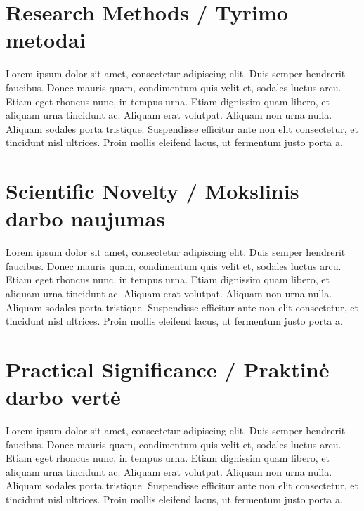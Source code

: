 \section*{Research Methods / Tyrimo metodai}

Lorem ipsum dolor sit amet, consectetur adipiscing elit. Duis semper hendrerit faucibus. Donec mauris quam, condimentum quis velit et, sodales luctus arcu. Etiam eget rhoncus nunc, in tempus urna. Etiam dignissim quam libero, et aliquam urna tincidunt ac. Aliquam erat volutpat. Aliquam non urna nulla. Aliquam sodales porta tristique. Suspendisse efficitur ante non elit consectetur, et tincidunt nisl ultrices. Proin mollis eleifend lacus, ut fermentum justo porta a.



\section*{Scientific Novelty / Mokslinis darbo naujumas} %

Lorem ipsum dolor sit amet, consectetur adipiscing elit. Duis semper hendrerit faucibus. Donec mauris quam, condimentum quis velit et, sodales luctus arcu. Etiam eget rhoncus nunc, in tempus urna. Etiam dignissim quam libero, et aliquam urna tincidunt ac. Aliquam erat volutpat. Aliquam non urna nulla. Aliquam sodales porta tristique. Suspendisse efficitur ante non elit consectetur, et tincidunt nisl ultrices. Proin mollis eleifend lacus, ut fermentum justo porta a.



\section*{Practical Significance / Praktinė darbo vertė}  %

Lorem ipsum dolor sit amet, consectetur adipiscing elit. Duis semper hendrerit faucibus. Donec mauris quam, condimentum quis velit et, sodales luctus arcu. Etiam eget rhoncus nunc, in tempus urna. Etiam dignissim quam libero, et aliquam urna tincidunt ac. Aliquam erat volutpat. Aliquam non urna nulla. Aliquam sodales porta tristique. Suspendisse efficitur ante non elit consectetur, et tincidunt nisl ultrices. Proin mollis eleifend lacus, ut fermentum justo porta a.



